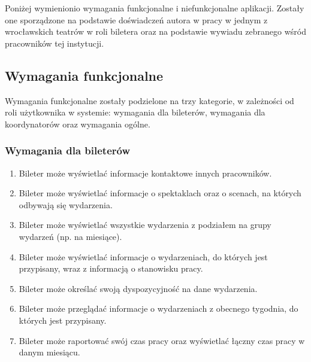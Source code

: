 \documentclass[shortabstract]{iithesis}
\begin{document}
Poniżej wymienionio wymagania funkcjonalne i niefunkcjonalne aplikacji. Zostały one sporządzone na podstawie doświadczeń autora w pracy w jednym z wrocławskich teatrów w roli biletera oraz na podstawie wywiadu zebranego wśród pracowników tej instytucji.

\subsection{Wymagania funkcjonalne}

Wymagania funkcjonalne zostały podzielone na trzy kategorie, w zależności od roli użytkownika w systemie: wymagania dla bileterów, wymagania dla koordynatorów oraz wymagania ogólne.

\newpage

\subsubsection*{Wymagania dla bileterów}
\begin{enumerate}
  \item Bileter może wyświetlać informacje kontaktowe innych pracowników.
  \item Bileter może wyświetlać informacje o spektaklach oraz o scenach, na których odbywają się wydarzenia.
  \item Bileter może wyświetlać wszystkie wydarzenia z podziałem na grupy wydarzeń (np. na miesiące).
  \item Bileter może wyświetlać informacje o wydarzeniach, do których jest przypisany, wraz z informacją o stanowisku pracy.
  \item Bileter może określać swoją dyspozycyjność na dane wydarzenia.
  \item Bileter może przeglądać informacje o wydarzeniach z obecnego tygodnia, do których jest przypisany.
  \item Bileter może raportować swój czas pracy oraz wyświetlać łączny czas pracy w danym miesiącu.
\end{enumerate}
\end{document}
